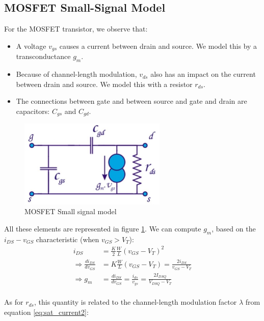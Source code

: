 \subsection{MOSFET Small-Signal Model}
\label{sec:mosfet_small_signal}
For the MOSFET transistor, we observe that:
\begin{itemize}
	\item A voltage $v_{gs}$ causes a current between drain and source. We model this by a transconductance $g_m$.
	\item Because of channel-length modulation, $v_{ds}$ also has an impact on the current between drain and source. We model this with a resistor $r_{ds}$.
	\item The connections between gate and between source and gate and drain are capacitors: $C_{gs}$ and $C_{gd}$.
\end{itemize}

\begin{figure}[h!]
	\centering
	\includegraphics[width=7cm]{figures/ch02/small_signal_model4.jpg}
	\caption{MOSFET Small signal model}
	\label{fig:small_signal_model4}
\end{figure}

All these elements are represented in figure \ref{fig:small_signal_model4}. We can compute $g_m$, based on the $i_{DS} - v_{GS}$ characteristic (when $v_{GS} > V_T$):
\begin{equation}
	\begin{split}
		i_{DS} &= \frac{K}{2} \frac{W}{L}(v_{GS} - V_T)^2 \\
		\Rightarrow \frac{di_{DS}}{dv_{GS}} &= K \frac{W}{L}(v_{GS} - V_T)  = \frac{2i_{DS}}{v_{GS} - V_T}\\
		\Rightarrow g_m &= \frac{di_{DS}}{dv_{GS}}=\frac{i_{ds}}{v_{gs}} = \frac{2I_{DSQ}}{V_{DSQ} - V_T}
	\end{split}
\end{equation}
\\As for $r_{ds}$, this quantity is related to the channel-length modulation factor $\lambda$ from equation \ref{eq:sat_current2}:

